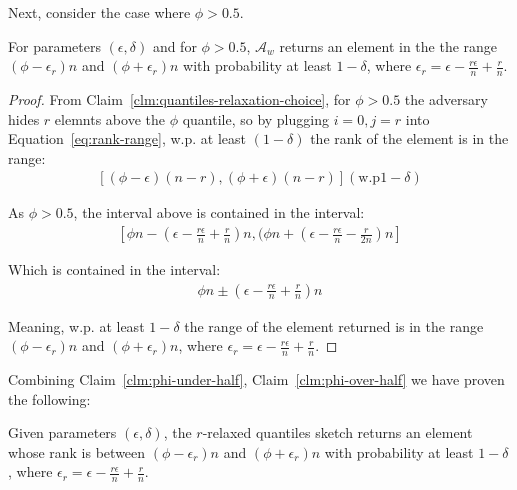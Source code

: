 Next, consider the case where $\phi > 0.5$. 
\begin{claim}

    For parameters $(\epsilon,\delta)$ and for $\phi > 0.5$, ${\mathcal{A}}_w$ returns an element in the the range 
    $(\phi-\epsilon_r)n$ and $(\phi+\epsilon_r)n$ with probability at
    least $1-\delta$, where $\epsilon_r=\epsilon - \frac{r \epsilon}{n} + \frac{r}{n}$.
    \label{clm:phi-over-half}
\end{claim}
\begin{proof}
    From Claim~\ref{clm:quantiles-relaxation-choice}, for $\phi > 0.5$ the adversary hides $r$ elemnts
    above the $\phi$ quantile, so by plugging $i=0,j=r$ into Equation~\ref{eq:rank-range}, w.p. at least $(1-\delta)$ the 
    rank of the element is in the range:
    \begin{align*}
        \left[ (\phi-\epsilon)(n-r),(\phi+\epsilon)(n-r) \right] (\text{w.p} 1-\delta)
    \end{align*}

    As $\phi > 0.5$, the interval above is contained in the interval:
    \begin{align*}
        \left[ \phi n - \left(\epsilon - \frac{r\epsilon}{n}+\frac{r}{n}\right)n  , (\phi n + \left(\epsilon - \frac{r\epsilon}{n}-\frac{r}{2n}\right)n \right]
    \end{align*}

    Which is contained in the interval:
    \begin{align*}
        \phi n \pm \left(\epsilon - \frac{r\epsilon}{n}+\frac{r}{n}\right)n
    \end{align*}

    Meaning, w.p. at least $1-\delta$ the range of the element returned is in the range $(\phi-\epsilon_r)n$ and
    $(\phi+\epsilon_r)n$, where $\epsilon_r=\epsilon - \frac{r \epsilon}{n} + \frac{r}{n}$.
\end{proof}

Combining Claim~\ref{clm:phi-under-half}, Claim~\ref{clm:phi-over-half} we have proven the following:
\begin{lemma}
    Given parameters $(\epsilon,\delta)$, the $r$-relaxed quantiles sketch returns an element whose rank is
    between $(\phi-\epsilon_r)n$ and $(\phi+\epsilon_r)n$ with probability at
    least $1-\delta$, where $\epsilon_r=\epsilon - \frac{r \epsilon}{n} + \frac{r}{n}$.
    \label{lemma:quantiles-weak-adversary}
\end{lemma}

\fi

